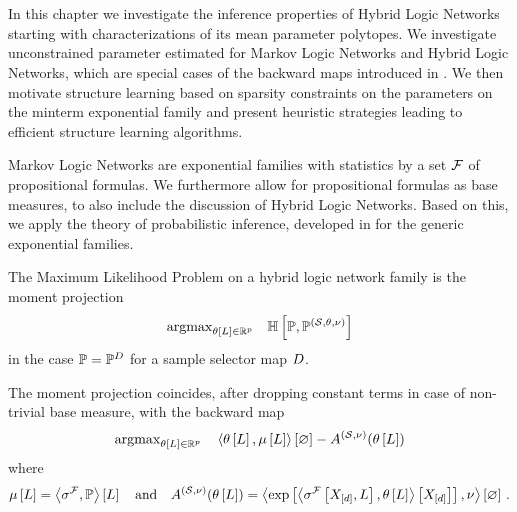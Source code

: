 \chapter{\chatextnetworkReasoning}\label{cha:networkReasoning}

In this chapter we investigate the inference properties of Hybrid Logic Networks starting with characterizations of its mean parameter polytopes.
We investigate unconstrained parameter estimated for Markov Logic Networks and Hybrid Logic Networks, which are special cases of the backward maps introduced in .
We then motivate structure learning based on sparsity constraints on the parameters on the minterm exponential family and present heuristic strategies leading to efficient structure learning algorithms.



 \label{sec:parameterEstimation} %

Markov Logic Networks are exponential families with statistics by a set $\mathcal{F}$ of propositional formulas.
We furthermore allow for propositional formulas as base measures, to also include the discussion of Hybrid Logic Networks.
Based on this, we apply the theory of probabilistic inference, developed in  for the generic exponential families.


The Maximum Likelihood Problem on a hybrid logic network family is the moment projection
\begin{align*}
    \mathrm{argmax}_{\theta\left[L\right]\in\mathbb{R}^{p}} \quad
    \mathbb{H}\left[\mathbb{P},\mathbb{P}^{(\mathcal{S},\theta,\nu)}\right]
\end{align*}
in the case $\mathbb{P}=\mathbb{P}^{D}$ for a sample selector map $D$.

The moment projection coincides, after dropping constant terms in case of non-trivial base measure, with the backward map
\begin{align*}
    \mathrm{argmax}_{\theta\left[L\right]\in\mathbb{R}^{p}} \quad
    \left\langle \theta\left[L\right],\mu\left[L\right]\right\rangle \left[ \varnothing \right] - A^{(\mathcal{S},\nu)}(\theta\left[L\right])
\end{align*}
where
\begin{align*}
    \mu\left[L\right]
    = \left\langle \sigma^{\mathcal{F}},\mathbb{P}\right\rangle \left[ L \right]
    \quad \text{and} \quad
    A^{(\mathcal{S},\nu)}(\theta\left[L\right])
    = \left\langle \mathrm{exp}\left[ \left\langle \sigma^{\mathcal{F}}\left[X_{[d]},L\right],\theta\left[L\right]\right\rangle \left[ X_{[d]} \right] \right], \nu\right\rangle \left[ \varnothing \right] \, .
\end{align*}

